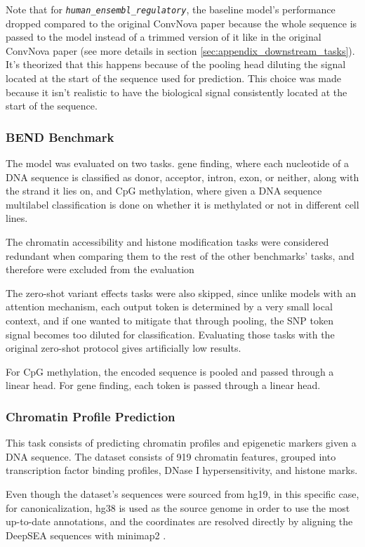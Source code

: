 \documentclass[   ]{article}
\let\oldtexttt\texttt
\renewcommand{\texttt}[1]{\oldtexttt{\itshape #1}}
\begin{document}
Note that for \texttt{human\_ensembl\_regulatory}, the baseline model's performance dropped compared to the original ConvNova paper because the whole sequence is passed to the model instead of a trimmed version of it like in the original ConvNova paper (see more details in section \ref{sec:appendix_downstream_tasks}). It's theorized that this happens because of the pooling head diluting the signal located at the start of the sequence used for prediction. This choice was made because it isn't realistic to have the biological signal consistently located at the start of the sequence.

\subsubsection{BEND Benchmark}
The model was evaluated on two tasks. gene finding, where each nucleotide of a DNA sequence is classified as donor, acceptor, intron, exon, or neither, along with the strand it lies on, and CpG methylation, where given a DNA sequence multilabel classification is
done on whether it is methylated or not in different cell lines.

The chromatin accessibility and histone modification tasks were considered redundant when comparing them to the rest of the other benchmarks' tasks, and therefore were excluded from the evaluation

The zero-shot variant effects tasks were also skipped, since unlike
models with an attention mechanism, each output token is determined by
a very small local context, and if one wanted to mitigate that through
pooling, the SNP token signal becomes too diluted for classification.
Evaluating those tasks with the original zero-shot protocol gives artificially low results.

For CpG methylation, the encoded sequence is pooled and passed through a linear head. For gene finding, each token is passed through a linear head.

\subsubsection{Chromatin Profile Prediction}
This task \citep{zhouPredictingEffectsNoncoding2015} consists of predicting
chromatin profiles and epigenetic markers given a DNA sequence. The
dataset consists of 919 chromatin features, grouped into transcription
factor binding profiles, DNase I hypersensitivity, and histone marks.

Even though the dataset's sequences were sourced from hg19, in this specific case, for
canonicalization, hg38 is used as the source genome in order to use the
most up-to-date annotations, and the coordinates are resolved directly
by aligning the DeepSEA sequences with minimap2
\citep{liMinimap2PairwiseAlignment2018}.
\end{document}
